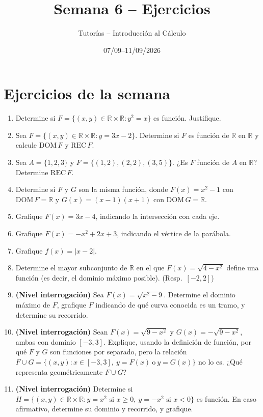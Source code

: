 \documentclass[11pt]{article}
\title{Semana 6 -- Ejercicios}
\author{Tutorías -- Introducción al Cálculo}
\date{07/09--11/09/2026}
\begin{document}
\maketitle

\section{Ejercicios de la semana}

\begin{enumerate}
    \item Determine si $F = \{(x,y) \in \mathbb{R}\times\mathbb{R} : y^2 = x\}$ es función.
    Justifique.

    \item Sea $F = \{(x,y)\in\mathbb{R}\times\mathbb{R} : y = 3x-2\}$. Determine si $F$ es función
    de $\mathbb{R}$ en $\mathbb{R}$ y calcule $\text{DOM}\, F$ y $\text{REC}\, F$.

    \item Sea $A = \{1,2,3\}$ y $F = \{(1,2),(2,2),(3,5)\}$. ¿Es $F$ función de $A$ en
    $\mathbb{R}$? Determine $\text{REC}\, F$.

    \item Determine si $F$ y $G$ son la misma función, donde $F(x) = x^2-1$ con
    $\text{DOM}\, F = \mathbb{R}$ y $G(x) = (x-1)(x+1)$ con $\text{DOM}\, G = \mathbb{R}$.

    \item Grafique $F(x) = 3x-4$, indicando la intersección con cada eje.

    \item Grafique $F(x) = -x^2+2x+3$, indicando el vértice de la parábola.

    \item Grafique $f(x) = |x-2|$.

    \item Determine el mayor subconjunto de $\mathbb{R}$ en el que
    $F(x) = \sqrt{4-x^2}$ define una función (es decir, el dominio máximo posible).
    \hfill (Resp.\ $[-2,2]$)

    \item \textbf{(Nivel interrogación)} Sea $F(x) = \sqrt{x^2-9}$. Determine el dominio máximo
    de $F$, grafique $F$ indicando de qué curva conocida es un tramo, y determine su recorrido.

    \item \textbf{(Nivel interrogación)} Sean $F(x) = \sqrt{9-x^2}$ y $G(x) = -\sqrt{9-x^2}$,
    ambas con dominio $[-3,3]$. Explique, usando la definición de función, por qué $F$ y $G$ son
    funciones por separado, pero la relación $F\cup G = \{(x,y) : x\in[-3,3],\ y=F(x)\ \text{o}\
    y=G(x)\}$ no lo es. ¿Qué representa geométricamente $F\cup G$?

    \item \textbf{(Nivel interrogación)} Determine si
    $H = \{(x,y)\in\mathbb{R}\times\mathbb{R} : y=x^2 \text{ si } x\ge0,\ y=-x^2 \text{ si }
    x<0\}$ es función. En caso afirmativo, determine su dominio y recorrido, y grafique.
\end{enumerate}
\end{document}
